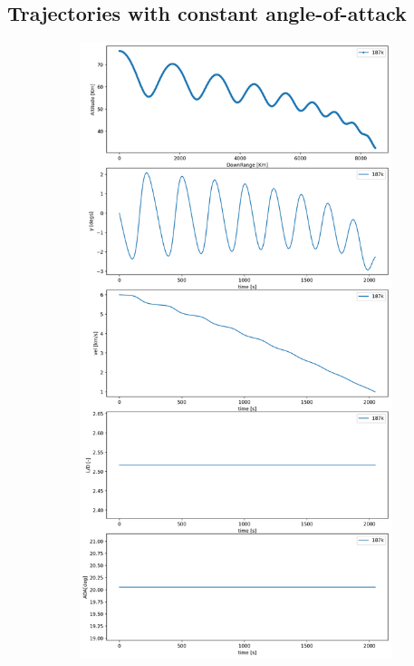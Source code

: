 \documentclass[11pt]{article} %
\begin{document}
\subsection*{ Trajectories with constant angle-of-attack }
\begin{figure}[hbt!]
    \begin{subfigure}[b]{0.5\textwidth}
      \centering
      \includegraphics[width=\textwidth]{images/og1.png}

\end{subfigure}
\end{figure}
\end{document}
